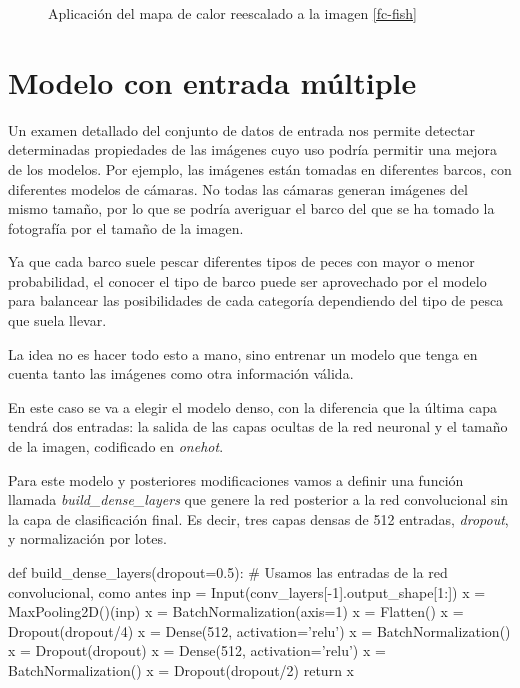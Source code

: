 \begin{figure}
    \caption{Aplicación del mapa de calor reescalado a la imagen \ref{fc-fish}}
\label{yft-heatmap}
\end{figure}

\section{Modelo con entrada múltiple}
\label{sec:multi_entry}

Un examen detallado del conjunto de datos de entrada nos permite detectar determinadas propiedades de las imágenes cuyo uso podría permitir una mejora de los modelos. Por ejemplo, las imágenes están tomadas en diferentes barcos, con diferentes modelos de cámaras. No todas las cámaras generan imágenes del mismo tamaño, por lo que se podría averiguar el barco del que se ha tomado la fotografía por el tamaño de la imagen.

Ya que cada barco suele pescar diferentes tipos de peces con mayor o menor probabilidad, el conocer el tipo de barco puede ser aprovechado por el modelo para balancear las posibilidades de cada categoría dependiendo del tipo de pesca que suela llevar.

La idea no es hacer todo esto a mano, sino entrenar un modelo que tenga en cuenta tanto las imágenes como otra información válida.

En este caso se va a elegir el modelo denso, con la diferencia que la última capa tendrá dos entradas: la salida de las capas ocultas de la red neuronal y el tamaño de la imagen, codificado en \textit{onehot}.

Para este modelo y posteriores modificaciones vamos a definir una función
llamada \textit{build\_dense\_layers} que genere la red posterior a la red
convolucional sin la capa de clasificación final. Es decir, tres capas densas de
512 entradas, \textit{dropout}, y normalización por lotes.

\begin{python}
def build_dense_layers(dropout=0.5):
    # Usamos las entradas de la red convolucional, como antes
    inp = Input(conv_layers[-1].output_shape[1:])
    x = MaxPooling2D()(inp)
    x = BatchNormalization(axis=1)
    x = Flatten()
    x = Dropout(dropout/4)
    x = Dense(512, activation='relu')
    x = BatchNormalization()
    x = Dropout(dropout)
    x = Dense(512, activation='relu')
    x = BatchNormalization()
    x = Dropout(dropout/2)
    return x

\end{python}

